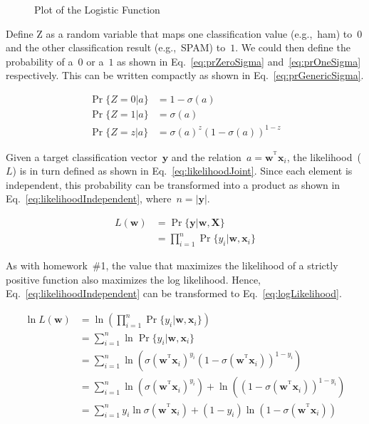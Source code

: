 \documentclass{report}
\newcommand{\xvec}{\mathbf{x}}
\newcommand{\xtensor}{\mathbf{X}}
\newcommand{\y}{\mathbf{y}}
\newcommand{\w}{\mathbf{w}}
\newcommand{\T}{^\textrm{T}}
\newcommand{\wTxi}{\w^{\T}\xvec_{i}}
\begin{document}
  \begin{figure}[tb]
    \centering
    \caption{Plot of the Logistic Function}\label{fig:sigmoidGraph}
  \end{figure}

  Define Z as a random variable that maps one classification value (e.g.,~ham) to~$0$ and the other classification result (e.g.,~SPAM) to~$1$.  We could then define the probability of a~$0$ or a~$1$ as shown in Eq.~\eqref{eq:prZeroSigma} and~\eqref{eq:prOneSigma} respectively.  This can be written compactly as shown in Eq.~\eqref{eq:prGenericSigma}.
  
  \begin{align}
    \Pr\{Z=0|a\}&=1-\sigma(a)\label{eq:prZeroSigma}\\
    \Pr\{Z=1|a\}&=\sigma(a)\label{eq:prOneSigma}\\
    \Pr\{Z=z|a\}&=\sigma(a)^{z}(1-\sigma(a))^{1-z}\label{eq:prGenericSigma}
  \end{align}
 
  \noindent
  Given a target classification vector~$\y$ and the relation~$a=\wTxi$, the likelihood~($L$) is in turn defined as shown in Eq.~\eqref{eq:likelihoodJoint}.  Since each element is independent, this probability can be transformed into a product as shown in Eq.~\eqref{eq:likelihoodIndependent}, where~$n=|\y|$.
  
  \begin{align}
    L(\w)&=\Pr\{\y | \w, \xtensor \}\label{eq:likelihoodJoint}\\
        &=\prod_{i=1}^{n}\Pr\{y_i | \w, \xvec_i \}\label{eq:likelihoodIndependent}
  \end{align}
 
  As with homework~\#1, the value that maximizes the likelihood of a strictly positive function also maximizes the log likelihood.  Hence, Eq.~\eqref{eq:likelihoodIndependent} can be transformed to Eq.~\eqref{eq:logLikelihood}.
  
  \begin{align}
    \ln L(\w) &= \ln \left(\prod_{i=1}^{n}\Pr\{y_i | \w, \xvec_i \}\right)\\
             &= \sum_{i=1}^{n}\ln \Pr\{y_i | \w, \xvec_i\}\\
             &= \sum_{i=1}^{n}\ln \left( \sigma(\wTxi)^{y_i} (1-\sigma(\wTxi))^{1-y_i} \right)\\
             &= \sum_{i=1}^{n} \ln \left(\sigma(\wTxi)^{y_i}\right) + \ln \left( (1-\sigma(\wTxi))^{1-y_i} \right) \\
             &= \sum_{i=1}^{n} y_i \ln \sigma(\wTxi) + (1-y_i) \ln (1-\sigma(\wTxi)) \label{eq:logLikelihood}
  \end{align}
 
\end{document}
